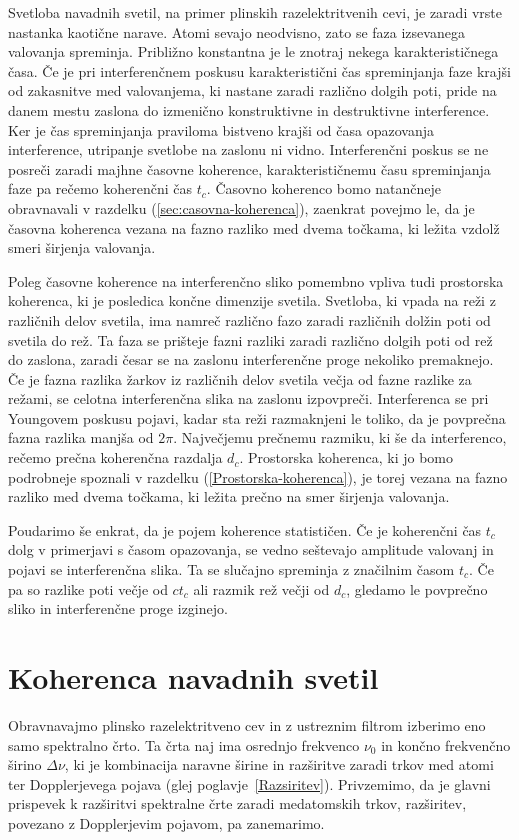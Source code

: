 Svetloba navadnih svetil, na primer plinskih razelektritvenih cevi, 
je zaradi vrste nastanka kaotične narave. 
Atomi sevajo neodvisno, zato se faza izsevanega valovanja
spreminja. Približno konstantna je le znotraj nekega karakterističnega
časa. Če je pri interferenčnem poskusu karakteristični čas spreminjanja
faze krajši od zakasnitve med valovanjema, ki nastane zaradi različno
dolgih poti, pride na danem mestu zaslona do izmenično konstruktivne in 
destruktivne interference. Ker je čas spreminjanja praviloma
bistveno krajši od časa opazovanja interference,
utripanje svetlobe na zaslonu ni vidno. Interferenčni poskus se ne 
posreči zaradi majhne časovne koherence,
karakterističnemu času spreminjanja faze pa rečemo 
koherenčni čas
$t_{c}$. Časovno koherenco bomo natančneje obravnavali v razdelku
(\ref{sec:casovna-koherenca}), zaenkrat povejmo le, da je časovna
koherenca vezana na fazno razliko med dvema točkama, ki ležita
vzdolž smeri širjenja valovanja. 

Poleg časovne koherence na interferenčno sliko pomembno vpliva tudi
prostorska koherenca, ki je posledica
končne dimenzije svetila. Svetloba, ki vpada na reži z različnih delov
svetila, ima namreč različno fazo zaradi različnih dolžin poti od
svetila do rež. Ta faza se prišteje fazni razliki zaradi različno
dolgih poti od rež do zaslona, zaradi česar se na zaslonu interferenčne
proge nekoliko premaknejo. Če je fazna razlika žarkov iz različnih
delov svetila večja od fazne razlike za režami, se celotna interferenčna
slika na zaslonu izpovpreči. Interferenca se pri Youngovem poskusu
pojavi, kadar sta reži razmaknjeni le toliko, da je povprečna fazna
razlika manjša od $2\pi$. Največjemu prečnemu razmiku, ki še da interferenco,
rečemo prečna koherenčna razdalja $d_{c}$. 
Prostorska koherenca, ki jo bomo podrobneje spoznali v razdelku 
(\ref{Prostorska-koherenca}),
je torej vezana na fazno razliko med dvema točkama, ki ležita prečno 
na smer širjenja valovanja.

Poudarimo še enkrat, da je pojem koherence statističen.
Če je koherenčni čas $t_{c}$ dolg v primerjavi s časom opazovanja,
se vedno seštevajo amplitude valovanj in pojavi se interferenčna slika.
Ta se slučajno spreminja z značilnim časom $t_{c}$. Če pa so razlike
poti večje od $ct_{c}$ ali razmik rež večji od $d_{c}$, gledamo
le povprečno sliko in interferenčne proge izginejo.

\section{Koherenca navadnih svetil}
\label{chap:kns}
Obravnavajmo plinsko razelektritveno cev in z
ustreznim filtrom izberimo eno samo spektralno črto. Ta črta naj ima
osrednjo frekvenco $\nu_{0}$ in končno frekvenčno širino $\Delta\nu$,
ki je kombinacija naravne širine in razširitve zaradi trkov med atomi
ter Dopplerjevega pojava (glej poglavje~\ref{Razsiritev}). Privzemimo,
da je glavni prispevek k razširitvi spektralne črte zaradi med\-atomskih
trkov, razširitev, povezano z Dopplerjevim pojavom, pa zanemarimo.

